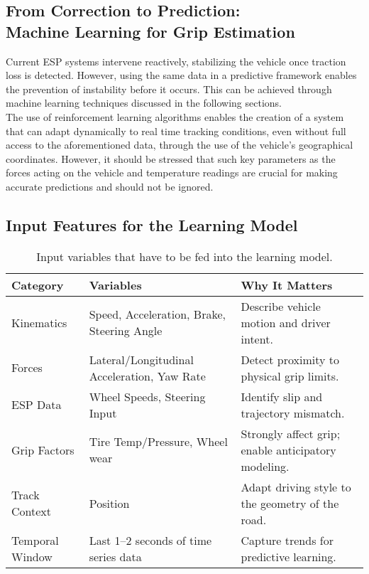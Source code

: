 \documentclass[a4paper,final,12pt]{report}
\begin{document}
\subsection{From Correction to Prediction: \\Machine Learning for Grip Estimation}
Current ESP systems intervene reactively, stabilizing the vehicle once traction loss is detected. However, using the same data in a predictive framework enables the prevention of instability before it occurs. This can be achieved through machine learning techniques discussed in the following sections.\\
The use of reinforcement learning algorithms enables the creation of a system that can adapt dynamically to real time tracking conditions, even without full access to the aforementioned data, through the use of the vehicle's geographical coordinates. However, it should be stressed that such key parameters as the forces acting on the vehicle and temperature readings are crucial for making accurate predictions and should not be ignored.

\newpage
\subsection{Input Features for the Learning Model}
\begin{table}[h]
\centering
\begin{tabular}{|l|p{5cm}|p{5cm}|}
\hline
\textbf{Category} & \textbf{Variables} & \textbf{Why It Matters} \\
\hline
Kinematics & Speed, Acceleration, Brake, Steering Angle & Describe vehicle motion and driver intent. \\
\hline
Forces & Lateral/Longitudinal Acceleration, Yaw Rate & Detect proximity to physical grip limits. \\
\hline
ESP Data & Wheel Speeds, Steering Input & Identify slip and trajectory mismatch. \\
\hline
Grip Factors & Tire Temp/Pressure, Wheel wear & Strongly affect grip; enable anticipatory modeling. \\
\hline
Track Context & Position & Adapt driving style to the geometry of the road. \\
\hline
Temporal Window & Last 1--2 seconds of time series data & Capture trends for predictive learning. \\
\hline
\end{tabular}
\caption{Input variables that have to be fed into the learning model.}
\end{table}
\end{document}
